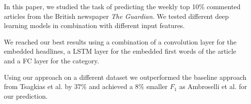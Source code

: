 In this paper, we studied the task of predicting the weekly top 10\% commented articles from the British newspaper \textit{The Guardian}. We tested different deep learning models in combination with different input features.

We reached our best results using a combination of a convolution layer for the embedded headlines, a LSTM layer for the embedded first words of the article and a FC layer for the category.

Using our approach on a different dataset we outperformed the baseline approach from Tsagkias et al. by $37\%$ and achieved a $8\%$ smaller $F_1$ as Ambroselli et al. for our prediction.
